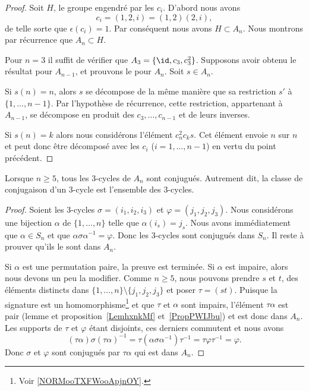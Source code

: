 \begin{proof}
	Soit \( H\), le groupe engendré par les \( c_i\). D'abord nous avons
	\begin{equation}
		c_i=(1,2,i)=(1,2)(2,i),
	\end{equation}
	de telle sorte que \( \epsilon(c_i)=1\). Par conséquent nous avons \( H\subset A_n\). Nous montrons par récurrence que \( A_n\subset H\).

	Pour \( n=3\) il suffit de vérifier que \( A_3=\{ \id,c_3,c_3^2 \}\). Supposons avoir obtenu le résultat pour \(A_{n-1}\), et prouvons le pour \( A_n\). Soit \( s\in A_n\).

	Si \( s(n)=n\), alors \( s\) se décompose de la même manière que sa restriction \( s'\) à \( \{ 1,\ldots, n-1 \}\). Par l'hypothèse de récurrence, cette restriction, appartenant à \( A_{n-1}\),  se décompose en produit des \( c_3,\ldots, c_{n-1}\) et de leurs inverses.

	Si \( s(n)=k\) alors nous considérons l'élément \( c^2_nc_ks\). Cet élément envoie \( n\) sur \( n\) et peut donc être décomposé avec les \( c_i\) (\( i=1,\ldots, n-1\)) en vertu du point précédent.
\end{proof}

\begin{proposition} \label{PropiodtBG}
	Lorsque \( n\geq 5\), tous les \( 3\)-cycles de \( A_n\) sont conjugués. Autrement dit, la classe de conjugaison d'un \( 3\)-cycle est l'ensemble des \( 3\)-cycles.
\end{proposition}

\begin{proof}
	Soient les \( 3\)-cycles \( \sigma=(i_1,i_2,i_3)\) et \( \varphi=(j_1,j_2,j_3)\). Nous considérons une bijection \( \alpha\) de \( \{ 1,\ldots, n \}\) telle que \( \alpha(i_s)=j_s\). Nous avons immédiatement que \( \alpha\in S_n\) et que \( \alpha\sigma\alpha^{-1}=\varphi\). Donc les \( 3\)-cycles sont conjugués dans \( S_n\). Il reste à prouver qu'ils le sont dans \( A_n\).

	Si \( \alpha\) est une permutation paire, la preuve est terminée. Si \( \alpha\) est impaire, alors nous devons un peu la modifier. Comme \( n\geq 5\), nous pouvons prendre \( s\) et \( t\), des éléments distincts dans \( \{ 1,\ldots, n \}\setminus\{ j_1,j_2,j_3 \}\) et poser \( \tau=(st)\). Puisque la signature est un homomorphisme\footnote{Voir \ref{NORMooTXFWooApjnOY}.} et que \( \tau\) et \( \alpha\) sont impairs, l'élément \( \tau\alpha\) est pair (lemme et proposition~\ref{LemhxnkMf} et~\ref{PropPWIJbu}) et est donc dans \( A_n\). Les supports de \( \tau\) et \( \varphi\) étant disjoints, ces derniers commutent et nous avons
	\begin{equation}
		(\tau\alpha)\sigma(\tau\alpha)^{-1}=\tau(\alpha\sigma\alpha^{-1})\tau^{-1}=\tau\varphi\tau^{-1} = \varphi.
	\end{equation}
	Donc \( \sigma\) et \( \varphi\) sont conjugués par \( \tau\alpha\) qui est dans \( A_n\).
\end{proof}

